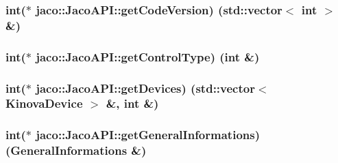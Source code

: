 \subsubsection[{\texorpdfstring{get\+Code\+Version}{getCodeVersion}}]{\setlength{\rightskip}{0pt plus 5cm}int($\ast$ jaco\+::\+Jaco\+A\+P\+I\+::get\+Code\+Version) (std\+::vector$<$ int $>$ \&)}\hypertarget{classjaco_1_1_jaco_a_p_i_ab2e6426177bd24cd1a381f0f1a9d277a}{}\label{classjaco_1_1_jaco_a_p_i_ab2e6426177bd24cd1a381f0f1a9d277a}
\subsubsection[{\texorpdfstring{get\+Control\+Type}{getControlType}}]{\setlength{\rightskip}{0pt plus 5cm}int($\ast$ jaco\+::\+Jaco\+A\+P\+I\+::get\+Control\+Type) (int \&)}\hypertarget{classjaco_1_1_jaco_a_p_i_aff9218e13471d4d021f8144738c73ff1}{}\label{classjaco_1_1_jaco_a_p_i_aff9218e13471d4d021f8144738c73ff1}
\subsubsection[{\texorpdfstring{get\+Devices}{getDevices}}]{\setlength{\rightskip}{0pt plus 5cm}int($\ast$ jaco\+::\+Jaco\+A\+P\+I\+::get\+Devices) (std\+::vector$<$ {\bf Kinova\+Device} $>$ \&, int \&)}\hypertarget{classjaco_1_1_jaco_a_p_i_a6f80ab16b2518ecb0ddefcd7183027c1}{}\label{classjaco_1_1_jaco_a_p_i_a6f80ab16b2518ecb0ddefcd7183027c1}
\subsubsection[{\texorpdfstring{get\+General\+Informations}{getGeneralInformations}}]{\setlength{\rightskip}{0pt plus 5cm}int($\ast$ jaco\+::\+Jaco\+A\+P\+I\+::get\+General\+Informations) ({\bf General\+Informations} \&)}\hypertarget{classjaco_1_1_jaco_a_p_i_ae1e29dcccd26e66e34271beff3a52f8c}{}\label{classjaco_1_1_jaco_a_p_i_ae1e29dcccd26e66e34271beff3a52f8c}
